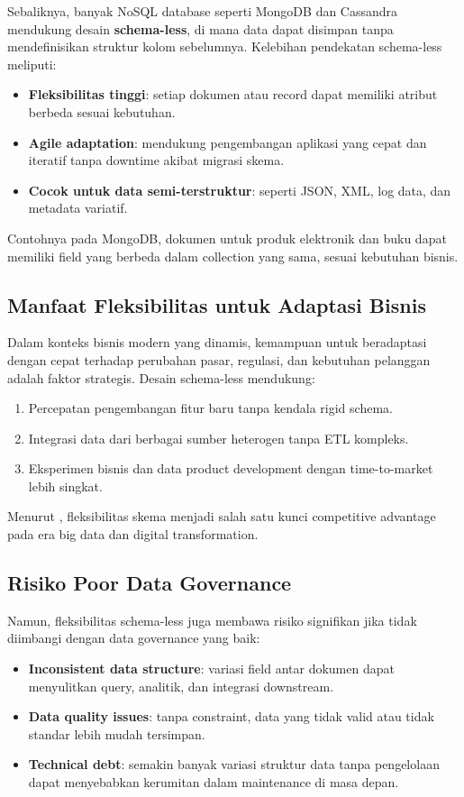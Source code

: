 Sebaliknya, banyak NoSQL database seperti MongoDB dan Cassandra mendukung desain \textbf{schema-less}, di mana data dapat disimpan tanpa mendefinisikan struktur kolom sebelumnya. Kelebihan pendekatan schema-less meliputi:
\begin{itemize}
	\item \textbf{Fleksibilitas tinggi}: setiap dokumen atau record dapat memiliki atribut berbeda sesuai kebutuhan.
	\item \textbf{Agile adaptation}: mendukung pengembangan aplikasi yang cepat dan iteratif tanpa downtime akibat migrasi skema.
	\item \textbf{Cocok untuk data semi-terstruktur}: seperti JSON, XML, log data, dan metadata variatif.
\end{itemize}

Contohnya pada MongoDB, dokumen untuk produk elektronik dan buku dapat memiliki field yang berbeda dalam collection yang sama, sesuai kebutuhan bisnis.


\subsection{Manfaat Fleksibilitas untuk Adaptasi Bisnis}

Dalam konteks bisnis modern yang dinamis, kemampuan untuk beradaptasi dengan cepat terhadap perubahan pasar, regulasi, dan kebutuhan pelanggan adalah faktor strategis. Desain schema-less mendukung:
\begin{enumerate}
	\item Percepatan pengembangan fitur baru tanpa kendala rigid schema.
	\item Integrasi data dari berbagai sumber heterogen tanpa ETL kompleks.
	\item Eksperimen bisnis dan data product development dengan time-to-market lebih singkat.
\end{enumerate}

Menurut \cite{gandomi2015}, fleksibilitas skema menjadi salah satu kunci competitive advantage pada era big data dan digital transformation.

\subsection{Risiko Poor Data Governance}

Namun, fleksibilitas schema-less juga membawa risiko signifikan jika tidak diimbangi dengan data governance yang baik:
\begin{itemize}
	\item \textbf{Inconsistent data structure}: variasi field antar dokumen dapat menyulitkan query, analitik, dan integrasi downstream.
	\item \textbf{Data quality issues}: tanpa constraint, data yang tidak valid atau tidak standar lebih mudah tersimpan.
	\item \textbf{Technical debt}: semakin banyak variasi struktur data tanpa pengelolaan dapat menyebabkan kerumitan dalam maintenance di masa depan.
\end{itemize}

